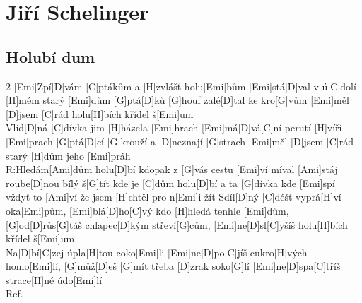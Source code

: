 \documentclass[12pt]{article}
\begin{document}
\section{Jiří Schelinger}

\subsection{Holubí dum}
\begin{multicols}{2}
	[Emi]Zpí[D]vám [C]ptákům a [H]zvlášť holu[Emi]bům
	[Emi]stá[D]val v ú[C]dolí [H]mém starý [Emi]dům
	[G]ptá[D]ků [G]houf zalé[D]tal ke kro[G]vům
	[Emi]měl [D]jsem [C]rád holu[H]bích křídel š[Emi]um
	\\
	[Emi]Vlíd[D]ná [C]dívka jim [H]házela [Emi]hrach
	[Emi]má[D]vá[C]ní perutí [H]víří [Emi]prach
	[G]ptá[D]cí [G]krouží a [D]neznají [G]strach
	[Emi]měl [D]jsem [C]rád starý [H]dům jeho [Emi]práh
	\\
	R:Hledám[Ami]dům holu[D]bí
	kdopak z [G]vás cestu [Emi]ví
	míval [Ami]stáj roube[D]nou bílý š[G]tít
	kde je [C]dům holu[D]bí a ta [G]dívka kde [Emi]spí
	vždyť to [Ami]ví že jsem [H]chtěl pro n[Emi]i žít
	\columnbreak
	[Emi]Sdíl[D]ný [C]déšť vyprá[H]ví oka[Emi]pům,
	[Emi]blá[D]ho[C]vý kdo [H]hledá tenhle [Emi]dům,
	[G]od[D]růs[G]táš chlapec[D]kým střeví[G]cům,
	[Emi]ne[D]sl[C]yšíš holu[H]bích křídel š[Emi]um
	\\
	[Emi]Na[D]bí[C]zej úpla[H]tou coko[Emi]li
	[Emi]ne[D]po[C]jíš cukro[H]vých homo[Emi]lí,
	[G]můž[D]eš [G]mít třeba [D]zrak soko[G]lí
	[Emi]ne[D]spa[C]tříš strace[H]né údo[Emi]lí
	\\
	Ref.
\end{multicols}

\guitarOff
\end{document}
